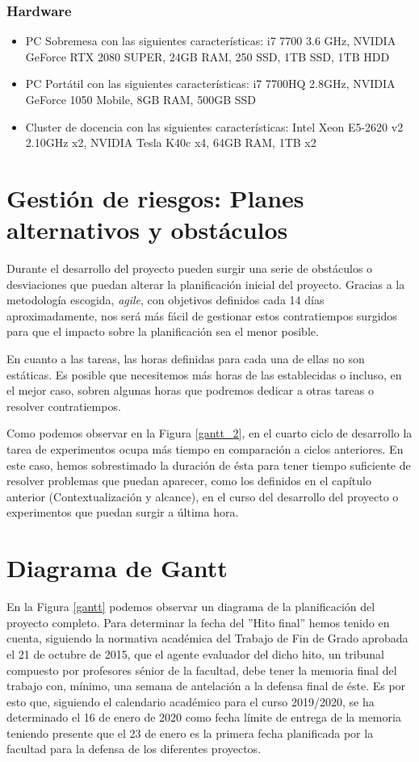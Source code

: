 \documentclass[titlepage,12pt]{report}
\begin{document}
\subsubsection{Hardware}

\begin{itemize}
	\item PC Sobremesa con las siguientes características: i7 7700 3.6 GHz, NVIDIA GeForce RTX 2080 SUPER, 24GB RAM, 250 SSD, 1TB SSD, 1TB HDD
	\item PC Portátil con las siguientes características: i7 7700HQ 2.8GHz, NVIDIA GeForce 1050 Mobile, 8GB RAM, 500GB SSD
	\item Cluster de docencia con las siguientes características: Intel Xeon E5-2620 v2 2.10GHz x2, NVIDIA Tesla K40c x4, 64GB RAM, 1TB x2
\end{itemize}

\section{Gestión de riesgos: Planes alternativos y obstáculos}

Durante el desarrollo del proyecto pueden surgir una serie de obstáculos o desviaciones que puedan alterar la planificación inicial del proyecto. Gracias a la metodología escogida, \textit{agile}, con objetivos definidos cada 14 días aproximadamente, nos será más fácil de gestionar estos contratiempos surgidos para que el impacto sobre la planificación sea el menor posible.

En cuanto a las tareas, las horas definidas para cada una de ellas no son estáticas. Es posible que necesitemos más horas de las establecidas o incluso, en el mejor caso, sobren algunas horas que podremos dedicar a otras tareas o resolver contratiempos.

Como podemos observar en la Figura \ref{gantt_2}, en el cuarto ciclo de desarrollo la tarea de experimentos ocupa más tiempo en comparación a ciclos anteriores. En este caso, hemos sobrestimado la duración de ésta para tener tiempo suficiente de resolver problemas que puedan aparecer, como los definidos en el capítulo anterior (Contextualización y alcance), en el curso del desarrollo del proyecto o experimentos que puedan surgir a última hora.

\section{Diagrama de Gantt}

En la Figura \ref{gantt} podemos observar un diagrama de la planificación del proyecto completo. Para determinar la fecha del ''Hito final'' hemos tenido en cuenta, siguiendo la normativa académica del Trabajo de Fin de Grado aprobada el 21 de octubre de 2015, que el agente evaluador del dicho hito, un tribunal compuesto por profesores sénior de la facultad, debe tener la memoria final del trabajo con, mínimo, una semana de antelación a la defensa final de éste. Es por esto que, siguiendo el calendario académico para el curso 2019/2020, se ha determinado el 16 de enero de 2020 como fecha límite de entrega de la memoria teniendo presente que el 23 de enero es la primera fecha planificada por la facultad para la defensa de los diferentes proyectos.
\end{document}
